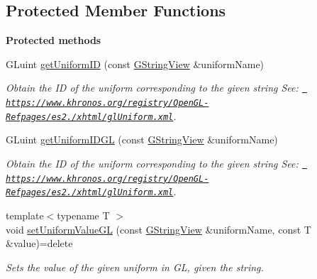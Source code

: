 \subsection*{Protected Member Functions}
\begin{Indent}\textbf{ Protected methods}\par
\begin{DoxyCompactItemize}
\item 
\mbox{\label{classrev_1_1_shader_program_aee5cee27b1538dc05ea437641d462135}} 
G\+Luint \mbox{\hyperlink{classrev_1_1_shader_program_aee5cee27b1538dc05ea437641d462135}{get\+Uniform\+ID}} (const \mbox{\hyperlink{classrev_1_1_g_string_view}{G\+String\+View}} \&uniform\+Name)
\begin{DoxyCompactList}\small\item\em Obtain the ID of the uniform corresponding to the given string See\+: \href{https://www.khronos.org/registry/OpenGL-Refpages/es2.0/xhtml/glUniform.xml}{\texttt{ https\+://www.\+khronos.\+org/registry/\+Open\+G\+L-\/\+Refpages/es2./xhtml/gl\+Uniform.\+xml}}. \end{DoxyCompactList}\item 
\mbox{\label{classrev_1_1_shader_program_ad42a2a63e9d9778b495c08deb27ebfc1}} 
G\+Luint \mbox{\hyperlink{classrev_1_1_shader_program_ad42a2a63e9d9778b495c08deb27ebfc1}{get\+Uniform\+I\+D\+GL}} (const \mbox{\hyperlink{classrev_1_1_g_string_view}{G\+String\+View}} \&uniform\+Name)
\begin{DoxyCompactList}\small\item\em Obtain the ID of the uniform corresponding to the given string See\+: \href{https://www.khronos.org/registry/OpenGL-Refpages/es2.0/xhtml/glUniform.xml}{\texttt{ https\+://www.\+khronos.\+org/registry/\+Open\+G\+L-\/\+Refpages/es2./xhtml/gl\+Uniform.\+xml}}. \end{DoxyCompactList}\item 
\mbox{\label{classrev_1_1_shader_program_a5b5daf795ba8813468ba4ed7a27b8da6}} 
{\footnotesize template$<$typename T $>$ }\\void \mbox{\hyperlink{classrev_1_1_shader_program_a5b5daf795ba8813468ba4ed7a27b8da6}{set\+Uniform\+Value\+GL}} (const \mbox{\hyperlink{classrev_1_1_g_string_view}{G\+String\+View}} \&uniform\+Name, const T \&value)=delete
\begin{DoxyCompactList}\small\item\em Sets the value of the given uniform in GL, given the string. \end{DoxyCompactList}\item 

\end{DoxyCompactItemize}
\end{Indent}
